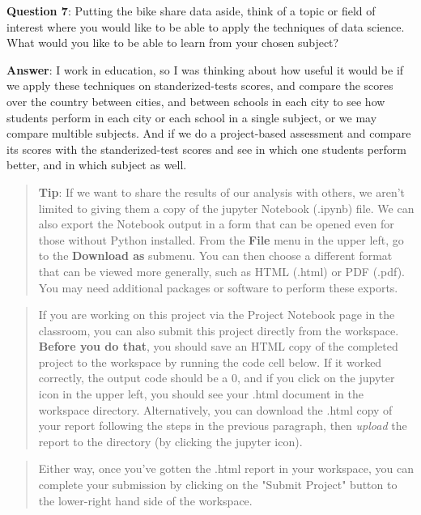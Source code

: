 \documentclass[11pt]{article}
\begin{document}
\textbf{Question 7}: Putting the bike share data aside, think of a topic
or field of interest where you would like to be able to apply the
techniques of data science. What would you like to be able to learn from
your chosen subject?

\textbf{Answer}: I work in education, so I was thinking about how useful
it would be if we apply these techniques on standerized-tests scores,
and compare the scores over the country between cities, and between
schools in each city to see how students perform in each city or each
school in a single subject, or we may compare multible subjects. And if
we do a project-based assessment and compare its scores with the
standerized-test scores and see in which one students perform better,
and in which subject as well.

\begin{quote}
\textbf{Tip}: If we want to share the results of our analysis with
others, we aren't limited to giving them a copy of the jupyter Notebook
(.ipynb) file. We can also export the Notebook output in a form that can
be opened even for those without Python installed. From the
\textbf{File} menu in the upper left, go to the \textbf{Download as}
submenu. You can then choose a different format that can be viewed more
generally, such as HTML (.html) or PDF (.pdf). You may need additional
packages or software to perform these exports.
\end{quote}

\begin{quote}
If you are working on this project via the Project Notebook page in the
classroom, you can also submit this project directly from the workspace.
\textbf{Before you do that}, you should save an HTML copy of the
completed project to the workspace by running the code cell below. If it
worked correctly, the output code should be a 0, and if you click on the
jupyter icon in the upper left, you should see your .html document in
the workspace directory. Alternatively, you can download the .html copy
of your report following the steps in the previous paragraph, then
\emph{upload} the report to the directory (by clicking the jupyter
icon).
\end{quote}

\begin{quote}
Either way, once you've gotten the .html report in your workspace, you
can complete your submission by clicking on the "Submit Project" button
to the lower-right hand side of the workspace.
\end{quote}
\end{document}
